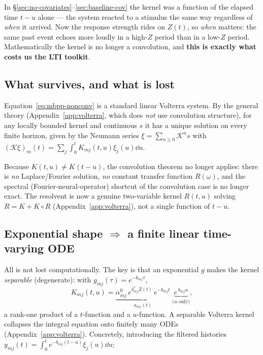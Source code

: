 \begin{intuition}
In \S\ref{sec:no-covariates}--\ref{sec:baseline-cov} the kernel was a function of
the elapsed time $t-u$ alone --- the system reacted to a stimulus the same way
regardless of \emph{when} it arrived. Now the response strength rides on $Z(t)$, so
\emph{when} matters: the same past event echoes more loudly in a high-$Z$ period
than in a low-$Z$ period. Mathematically the kernel is no longer a convolution, and
\textbf{this is exactly what costs us the LTI toolkit}.
\end{intuition}

\subsection{What survives, and what is lost}

\begin{description}[leftmargin=1.4em,style=nextline]
\item[Well-posedness survives.] Equation~\eqref{eq:mbpp-nonconv} is a standard
linear Volterra system. By the general theory (Appendix~\ref{app:volterra}, which
does \emph{not} use convolution structure), for any locally bounded kernel and
continuous $s$ it has a unique solution on every finite horizon, given by the
Neumann series $\xi=\sum_{n\ge0}\mathcal K^n s$ with
$(\mathcal K\xi)_m(t)=\sum_j\int_0^t K_{mj}(t,u)\xi_j(u)\dd u$.
\item[Time-invariance is lost.] Because $K(t,u)\ne K(t-u)$, the convolution theorem
no longer applies: there is \emph{no} Laplace/Fourier solution, \emph{no} constant
transfer function $R(\omega)$, and the spectral (Fourier-neural-operator) shortcut
of the convolution case is no longer exact. The resolvent is now a genuine
two-variable kernel $R(t,u)$ solving $R=K+K\!\circ\!R$ (Appendix~\ref{app:volterra}),
not a single function of $t-u$.
\end{description}

\subsection{Exponential shape $\Rightarrow$ a finite linear time-varying ODE}

All is not lost computationally. The key is that an exponential $g$ makes the
kernel \emph{separable} (degenerate): with $g_{mj}(\tau)=e^{-b_{mj}\tau}$,
\begin{equation*}
K_{mj}(t,u)=\underbrace{\alpha^0_{mj}\,e^{\delta_{mj}^\top Z(t)}\,e^{-b_{mj}t}}_{a_{mj}(t)}\;\underbrace{e^{\,b_{mj}u}}_{\text{(}u\text{ only)}},
\end{equation*}
a rank-one product of a $t$-function and a $u$-function. A separable Volterra
kernel collapses the integral equation onto finitely many ODEs
(Appendix~\ref{app:volterra}). Concretely, introducing the filtered histories
$y_{mj}(t)=\int_0^t e^{-b_{mj}(t-u)}\xi_j(u)\dd u$:

